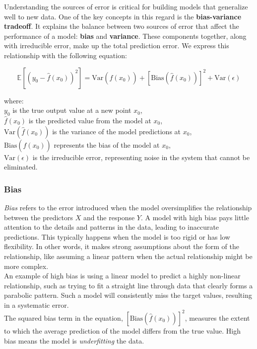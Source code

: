 Understanding the sources of error is critical for building models that generalize well to new data. One of the key concepts in this regard is the \textbf{bias-variance tradeoff}. It explains the balance between two sources of error that affect the performance of a model: \textbf{bias} and \textbf{variance}. These components together, along with irreducible error, make up the total prediction error. We express this relationship with the following equation:

\[
\mathbb{E} \left[ (y_0 - \hat{f}(x_0))^2 \right] = \text{Var}(\hat{f}(x_0)) + [\text{Bias}(\hat{f}(x_0))]^2 + \text{Var}(\epsilon)
\]

where:\\
 \( y_0 \) is the true output value at a new point \( x_0 \),\\
 \( \hat{f}(x_0) \) is the predicted value from the model at \( x_0 \),\\
 \( \text{Var}(\hat{f}(x_0)) \) is the variance of the model predictions at \( x_0 \),\\
 \( \text{Bias}(\hat{f}(x_0)) \) represents the bias of the model at \( x_0 \),\\
 \( \text{Var}(\epsilon) \) is the irreducible error, representing noise in the system that cannot be eliminated.

\subsubsection{Bias}

\textit{Bias} refers to the error introduced when the model oversimplifies the relationship between the predictors \( X \) and the response \( Y \). A model with high bias pays little attention to the details and patterns in the data, leading to inaccurate predictions. This typically happens when the model is too rigid or has low flexibility. In other words, it makes strong assumptions about the form of the relationship, like assuming a linear pattern when the actual relationship might be more complex.\\

An example of high bias is using a linear model to predict a highly non-linear relationship, such as trying to fit a straight line through data that clearly forms a parabolic pattern. Such a model will consistently miss the target values, resulting in a systematic error.\\

The squared bias term in the equation, \( [\text{Bias}(\hat{f}(x_0))]^2 \), measures the extent to which the average prediction of the model differs from the true value. High bias means the model is \textit{underfitting} the data.

